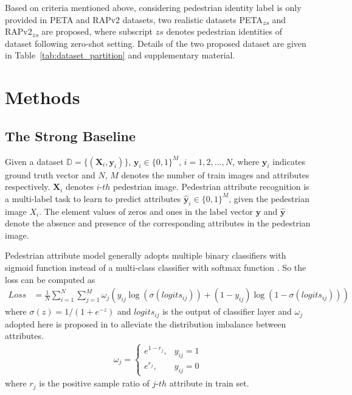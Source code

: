 \documentclass[runningheads]{llncs}
\begin{document}
Based on criteria mentioned above, considering pedestrian identity label is only provided in PETA and RAPv2 datasets, two realistic datasets PETA\textsubscript{$zs$} and RAPv2\textsubscript{$zs$} are proposed, where subscript $zs$ denotes pedestrian identities of dataset following zero-shot setting. 
Details of the two proposed dataset are given in Table~\ref{tab:dataset_partition} and supplementary material.


\section{Methods} \label{method}



\subsection{The Strong Baseline}
Given a dataset $\mathbb{D}=\{(\bm{X}_i, \bm{y}_i)\}$, $\bm{y}_i \in \{0, 1\}^{M}$, $i=1, 2, ..., N$, where $\bm{y}_i$ indicates ground truth vector and $N$, $M$ denotes the number of train images and attributes respectively. $\bm{X}_i$ denotes $i$-$th$ pedestrian image. Pedestrian attribute recognition is a multi-label task to learn to predict attributes $\bm{\hat{y}}_i \in \{0, 1\}^{M}$, given the pedestrian image $X_i$. The element values of zeros and ones in the label vector $\bm{y}$ and $\bm{\hat{y}}$ denote the absence and presence of the corresponding attributes in the pedestrian image.

Pedestrian attribute model generally adopts multiple binary classifiers with sigmoid function \cite{guo2019visual,tang2019Improving} instead of a multi-class classifier with softmax function \cite{wang2017normface,deng2019arcface}. So the loss can be computed as 
\begin{align}
	Loss & = \frac{1}{N} \sum_{i=1}^{N} \sum_{j=1}^{M} \omega_{j}(y_{ij} \log(\sigma(logits_{ij})) + (1 - y_{ij})\log(1 - \sigma(logits_{ij}))) 
	\label{eq:celoss}
\end{align}
where $\sigma(z) = 1/(1+ e^{-z})$ and $logits_{ij}$ is the output of classifier layer and $\omega_{j}$ adopted here is proposed in \cite{li2018pose} to alleviate the distribution imbalance between attributes.
\begin{align}
	\omega_{j} = 
    \begin{cases}
      e^{1 - r_{j}}, &  y_{ij}=1 \\
      e^{r_{j}}, & y_{ij}=0
    \end{cases}
\end{align}
where $r_{j} $ is the positive sample ratio of $j$-$th$ attribute in train set. 
\end{document}
